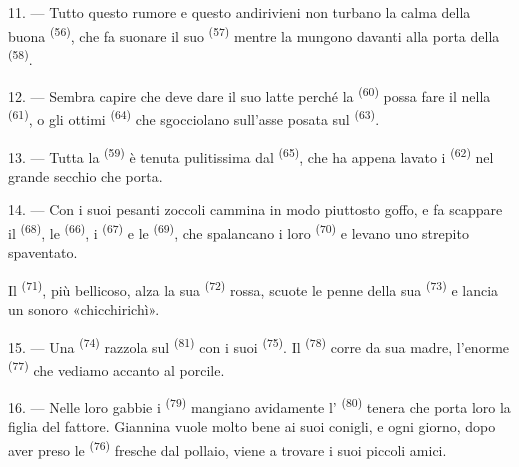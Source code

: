 11. --- Tutto questo rumore e questo andirivieni non turbano la calma della buona
 \textsuperscript{(56)}, che fa suonare il suo
 \textsuperscript{(57)} mentre la mungono davanti alla porta della
 \textsuperscript{(58)}.

12. --- Sembra capire che deve dare il suo latte perché la 
\textsuperscript{(60)} possa fare il  nella 
\textsuperscript{(61)}, o gli ottimi  \textsuperscript{(64)} che
sgocciolano sull'asse posata sul  \textsuperscript{(63)}.

13. --- Tutta la  \textsuperscript{(59)} è tenuta pulitissima
dal  \textsuperscript{(65)}, che ha appena lavato i  \textsuperscript{(62)} nel grande secchio che porta.

\VUsaut{3.0mm}
\VUsaut{3.0mm}

14. --- Con i suoi pesanti zoccoli cammina in modo piuttosto goffo, e fa scappare il
 \textsuperscript{(68)}, le  \textsuperscript{(66)}, i
 \textsuperscript{(67)} e le 
\textsuperscript{(69)}, che spalancano i loro  \textsuperscript{(70)} e
levano uno strepito spaventato.

Il  \textsuperscript{(71)}, più bellicoso, alza la sua 
\textsuperscript{(72)} rossa, scuote le penne della sua 
\textsuperscript{(73)} e lancia un sonoro «chicchirichì».

15. --- Una  \textsuperscript{(74)} razzola sul 
\textsuperscript{(81)} con i suoi  \textsuperscript{(75)}. Il
 \textsuperscript{(78)} corre da sua madre, l'enorme
 \textsuperscript{(77)} che vediamo accanto al porcile.

16. --- Nelle loro gabbie i  \textsuperscript{(79)} mangiano avidamente
l' \textsuperscript{(80)} tenera che porta loro la figlia del fattore.
Giannina vuole molto bene ai suoi conigli, e ogni giorno, dopo aver preso le
 \textsuperscript{(76)} fresche dal pollaio, viene a trovare i suoi
piccoli amici.
\VUsaut{6.0mm}
\VUfilet{22mm}
